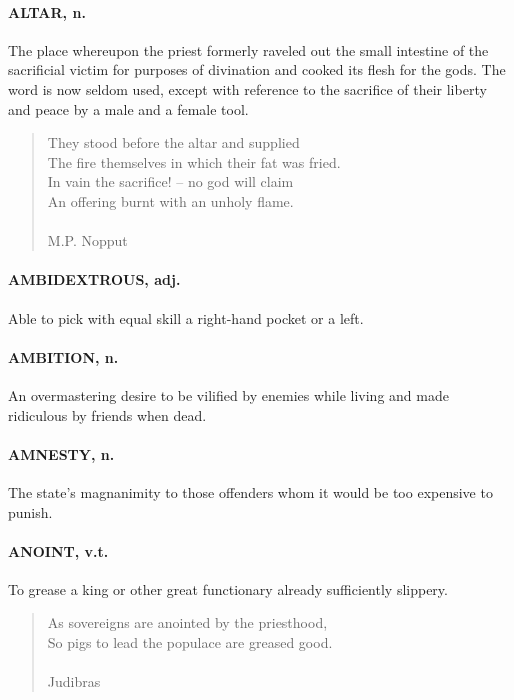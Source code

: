 \documentclass[11pt]{article}
\begin{document}
\paragraph{ALTAR, n.}  The place whereupon the priest formerly raveled out the
small intestine of the sacrificial victim for purposes of divination
and cooked its flesh for the gods.  The word is now seldom used,
except with reference to the sacrifice of their liberty and peace by a
male and a female tool.

\begin{quote}   They stood before the altar and supplied \\
  The fire themselves in which their fat was fried. \\
  In vain the sacrifice! -- no god will claim \\
  An offering burnt with an unholy flame. \\
 \\
M.P. Nopput \end{quote}


\paragraph{AMBIDEXTROUS, adj.}  Able to pick with equal skill a right-hand pocket
or a left.

\paragraph{AMBITION, n.}  An overmastering desire to be vilified by enemies while
living and made ridiculous by friends when dead.

\paragraph{AMNESTY, n.}  The state's magnanimity to those offenders whom it would
be too expensive to punish.

\paragraph{ANOINT, v.t.}  To grease a king or other great functionary already
sufficiently slippery.

\begin{quote}   As sovereigns are anointed by the priesthood, \\
  So pigs to lead the populace are greased good. \\
 \\
Judibras \end{quote}
\end{document}
